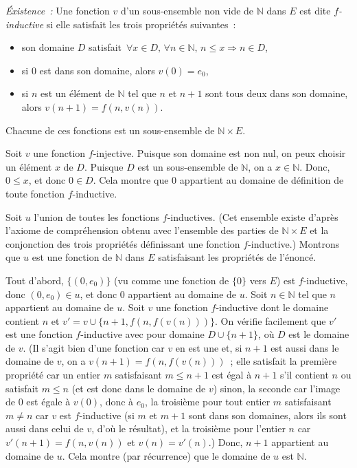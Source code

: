 \textit{Éxistence :} Une fonction $v$ d'un sous-ensemble non vide de $\mathbb{N}$ dans $E$ est dite \textit{$f$-inductive} si elle satisfait les trois propriétés suivantes : 
    \begin{itemize}[nosep]
        \item son domaine $D$ satisfait $\forall x \in D, \, \forall n \in \mathbb{N}, \, n \leq x \Rightarrow n \in D$, 
        \item si $0$ est dans son domaine, alors $v(0) = e_0$, 
        \item si $n$ est un élément de $\mathbb{N}$ tel que $n$ et $n+1$ sont tous deux dans son domaine, alors $v(n+1) = f(n, v(n))$. 
    \end{itemize}
   Chacune de ces fonctions est un sous-ensemble de $\mathbb{N} \times E$. 
   
   Soit $v$ une fonction $f$-injective. 
   Puisque son domaine est non nul, on peux choisir un élément $x$ de $D$. 
   Puisque $D$ est un sous-ensemble de $\mathbb{N}$, on a $x \in \mathbb{N}$. 
   Donc, $0  \leq x$, et donc $0 \in D$.
   Cela montre que $0$ appartient au domaine de définition de toute fonction $f$-inductive. 

   Soit $u$ l'union de toutes les fonctions $f$-inductives. 
   (Cet ensemble existe d'après l'axiome de compréhension obtenu avec l'ensemble des parties de $\mathbb{N} \times E$ et la conjonction des trois propriétés définissant une fonction $f$-inductive.)
   Montrons que $u$ est une fonction de $\mathbb{N}$ dans $E$ satisfaisant les propriétés de l'énoncé. 

   Tout d'abord, $\lbrace (0,e_0) \rbrace$ (vu comme une fonction de $\lbrace 0 \rbrace$ vers $E$) est $f$-inductive, donc $(0,e_0) \in u$, et donc $0$ appartient au domaine de $u$.
   Soit $n \in \mathbb{N}$ tel que $n$ appartient au domaine de $u$. 
   Soit $v$ une fonction $f$-inductive dont le domaine contient $n$ et $v' = v \cup \lbrace n+1, f(n, f(v(n))) \rbrace$. 
   On vérifie facilement que $v'$ est une fonction $f$-inductive avec pour domaine $D \cup \lbrace n+1 \rbrace$, où $D$ est le domaine de $v$. 
   (Il s'agit bien d'une fonction car $v$ en est une et, si $n+1$ est aussi dans le domaine de $v$, on a $v(n+1) = f(n, f(v(n)))$ ; elle satisfait la première propriété car un entier $m$ satisfaisant $m \leq n+1$ est égal à $n+1$ s'il contient $n$ ou satisfait $m \leq n$ (et est donc dans le domaine de $v$) sinon, la seconde car l'image de $0$ est égale à $v(0)$, donc à $e_0$, la troisième pour tout entier $m$ satisfaisant $m \neq n$ car $v$ est $f$-inductive (si $m$ et $m+1$ sont dans son domaines, alors ils sont aussi dans celui de $v$, d'où le résultat), et la troisième pour l'entier $n$ car $v'(n+1) = f(n,v(n))$ et $v(n) = v'(n)$.)
   Donc, $n+1$ appartient au domaine de $u$. 
   Cela montre (par récurrence) que le domaine de $u$ est $\mathbb{N}$. 


